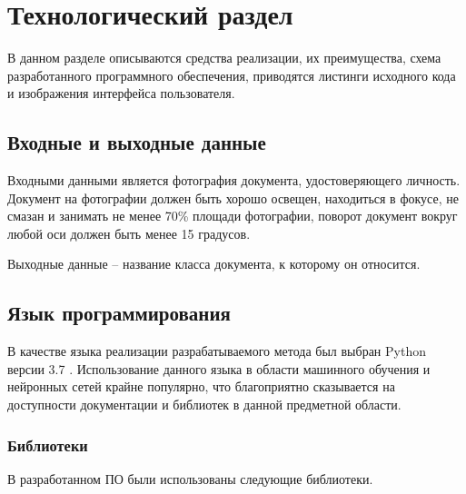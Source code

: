 \chapter{\textbf{Технологический раздел}}

В данном разделе описываются средства реализации, их преимущества, схема разработанного программного обеспечения, приводятся листинги исходного кода и изображения интерфейса пользователя.

\section{Входные и выходные данные}

Входными данными является фотография документа, удостоверяющего личность. Документ на фотографии должен быть хорошо освещен, находиться в фокусе, не смазан и занимать не менее 70\% площади фотографии, поворот документ вокруг любой оси должен быть менее 15 градусов.

Выходные данные -- название класса документа, к которому он относится.

\section{Язык программирования}

В качестве языка реализации разрабатываемого метода был выбран Python версии 3.7 \cite{python}. Использование данного языка в области машинного обучения и нейронных сетей крайне популярно, что благоприятно сказывается на доступности документации и библиотек в данной предметной области.

\subsection{Библиотеки}

В разработанном ПО были использованы следующие библиотеки.

